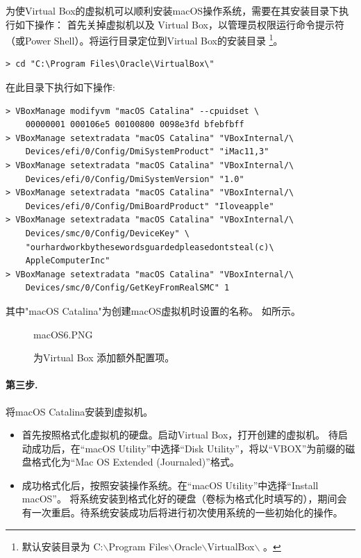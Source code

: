 \documentclass[final]{cvpr}
\newcommand{\mypara}[1]{\paragraph{#1.}}
\begin{document}
为使Virtual Box的虚拟机可以顺利安装macOS操作系统，需要在其安装目录下执行如下操作\cite{Web/installCatalina}：
首先关掉虚拟机以及 Virtual Box，以管理员权限运行命令提示符（或Power Shell）。将运行目录定位到Virtual Box的安装目录
\footnote{默认安装目录为 C:$\backslash$Program Files$\backslash$Oracle$\backslash$VirtualBox$\backslash$ 。 }。
\begin{lstlisting}
> cd "C:\Program Files\Oracle\VirtualBox\"
\end{lstlisting}
在此目录下执行如下操作:
\begin{lstlisting}
> VBoxManage modifyvm "macOS Catalina" --cpuidset \
    00000001 000106e5 00100800 0098e3fd bfebfbff
> VBoxManage setextradata "macOS Catalina" "VBoxInternal/\
    Devices/efi/0/Config/DmiSystemProduct" "iMac11,3"
> VBoxManage setextradata "macOS Catalina" "VBoxInternal/\
    Devices/efi/0/Config/DmiSystemVersion" "1.0"
> VBoxManage setextradata "macOS Catalina" "VBoxInternal/\
    Devices/efi/0/Config/DmiBoardProduct" "Iloveapple"
> VBoxManage setextradata "macOS Catalina" "VBoxInternal/\
    Devices/smc/0/Config/DeviceKey" \
    "ourhardworkbythesewordsguardedpleasedontsteal(c)\
    AppleComputerInc"
> VBoxManage setextradata "macOS Catalina" "VBoxInternal/\
    Devices/smc/0/Config/GetKeyFromRealSMC" 1
\end{lstlisting}
其中"macOS Catalina"为创建macOS虚拟机时设置的名称。
如\figref{fig:macOS6}所示。

\begin{figure}
  	\begin{overpic}[width=\columnwidth]{macOS6.PNG}\end{overpic}
    \caption{为Virtual Box 添加额外配置项。}\label{fig:macOS6}
\end{figure}

\mypara{第三步} 将macOS Catalina安装到虚拟机。

\begin{itemize}
    \item 首先按照格式化虚拟机的硬盘。启动Virtual Box，打开创建的虚拟机。
待启动成功后，在“macOS Utility”中选择“Disk Utility”，将以“VBOX”为前缀的磁盘格式化为“Mac OS Extended (Journaled)”格式。

    \item 成功格式化后，按照安装操作系统。在“macOS Utility”中选择“Install macOS”。
将系统安装到格式化好的硬盘（卷标为格式化时填写的），期间会有一次重启。待系统安装成功后将进行初次使用系统的一些初始化的操作。

\end{itemize}
\end{document}
